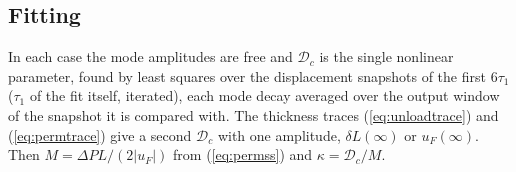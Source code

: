 \documentclass[11pt]{article}
\begin{document}
\subsection{Fitting}

In each case the mode amplitudes are free and $\mathcal{D}_c$ is the single nonlinear parameter, found by least squares over the displacement snapshots of the first $6\tau_1$ ($\tau_1$ of the fit itself, iterated), each mode decay averaged over the output window of the snapshot it is compared with. The thickness traces (\ref{eq:unloadtrace}) and (\ref{eq:permtrace}) give a second $\mathcal{D}_c$ with one amplitude, $\delta L(\infty)$ or $u_F(\infty)$. Then $M = \Delta P L/(2|u_F|)$ from (\ref{eq:permss}) and $\kappa = \mathcal{D}_c/M$.
\end{document}
